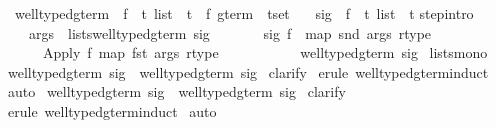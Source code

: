 \begin{isabellebody}
\isanewline
{}\isamarkupfalse%
\isanewline
\ \ well{\isacharunderscore}typed{\isacharunderscore}gterm{\isacharprime}\ {\isacharcolon}{\isacharcolon}\ {\isachardoublequoteopen}{\isacharparenleft}{\isacharprime}f\ {\isasymRightarrow}\ {\isacharprime}t\ list\ {\isacharasterisk}\ {\isacharprime}t{\isacharparenright}\ {\isasymRightarrow}\ {\isacharparenleft}{\isacharprime}f\ gterm\ {\isacharasterisk}\ {\isacharprime}t{\isacharparenright}set{\isachardoublequoteclose}\isanewline
\ \ \ sig\ {\isacharcolon}{\isacharcolon}\ {\isachardoublequoteopen}{\isacharprime}f\ {\isasymRightarrow}\ {\isacharprime}t\ list\ {\isacharasterisk}\ {\isacharprime}t{\isachardoublequoteclose}\isanewline
{}\isanewline
step{\isacharbrackleft}intro{\isacharbang}{\isacharbrackright}{\isacharcolon}\ \isanewline
\ \ \ \ {\isachardoublequoteopen}{\isasymlbrakk}args\ {\isasymin}\ lists{\isacharparenleft}well{\isacharunderscore}typed{\isacharunderscore}gterm{\isacharprime}\ sig{\isacharparenright}{\isacharsemicolon}\ \isanewline
\ \ \ \ \ \ sig\ f\ {\isacharequal}\ {\isacharparenleft}map\ snd\ args{\isacharcomma}\ rtype{\isacharparenright}{\isasymrbrakk}\isanewline
\ \ \ \ \ {\isasymLongrightarrow}\ {\isacharparenleft}Apply\ f\ {\isacharparenleft}map\ fst\ args{\isacharparenright}{\isacharcomma}\ rtype{\isacharparenright}\ \isanewline
\ \ \ \ \ \ \ \ \ {\isasymin}\ well{\isacharunderscore}typed{\isacharunderscore}gterm{\isacharprime}\ sig{\isachardoublequoteclose}\isanewline
{}\ lists{\isacharunderscore}mono\isanewline
\isanewline
\isanewline
{}\isamarkupfalse%
\ {\isachardoublequoteopen}well{\isacharunderscore}typed{\isacharunderscore}gterm\ sig\ {\isasymsubseteq}\ well{\isacharunderscore}typed{\isacharunderscore}gterm{\isacharprime}\ sig{\isachardoublequoteclose}\isanewline
%
\isadelimproof
%
\endisadelimproof
%
\isatagproof
{}\isamarkupfalse%
\ clarify\isanewline
{}\isamarkupfalse%
\ {\isacharparenleft}erule\ well{\isacharunderscore}typed{\isacharunderscore}gterm{\isachardot}induct{\isacharparenright}\isanewline
{}\isamarkupfalse%
\ auto\isanewline
{}\isamarkupfalse%
%
\endisatagproof
{\isafoldproof}%
%
\isadelimproof
\isanewline
%
\endisadelimproof
\isanewline
{}\isamarkupfalse%
\ {\isachardoublequoteopen}well{\isacharunderscore}typed{\isacharunderscore}gterm{\isacharprime}\ sig\ {\isasymsubseteq}\ well{\isacharunderscore}typed{\isacharunderscore}gterm\ sig{\isachardoublequoteclose}\isanewline
%
\isadelimproof
%
\endisadelimproof
%
\isatagproof
{}\isamarkupfalse%
\ clarify\isanewline
{}\isamarkupfalse%
\ {\isacharparenleft}erule\ well{\isacharunderscore}typed{\isacharunderscore}gterm{\isacharprime}{\isachardot}induct{\isacharparenright}\isanewline
{}\isamarkupfalse%
\ auto\isanewline
{}\isamarkupfalse%
%
\endisatagproof
{\isafoldproof}%
%
\isadelimproof
\isanewline
%
\endisadelimproof
\isanewline
%
\isadelimtheory
\isanewline
%
\endisadelimtheory
%
\isatagtheory
{}\isamarkupfalse%
%
\endisatagtheory
{\isafoldtheory}%
%
\isadelimtheory
\isanewline
%
\endisadelimtheory
\isanewline
\end{isabellebody}%
